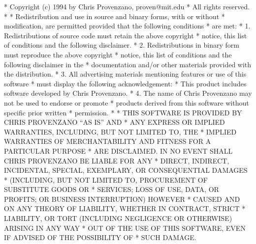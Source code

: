 \begin{copyrightEnv}
 * Copyright (c) 1994 by Chris Provenzano, proven@mit.edu
 * All rights reserved.
 *
 * Redistribution and use in source and binary forms, with or without
 * modification, are permitted provided that the following conditions
 * are met:
 * 1. Redistributions of source code must retain the above copyright
 *    notice, this list of conditions and the following disclaimer.
 * 2. Redistributions in binary form must reproduce the above copyright
 *    notice, this list of conditions and the following disclaimer in the
 *    documentation and/or other materials provided with the distribution.
 * 3. All advertising materials mentioning features or use of this software
 *    must display the following acknowledgement:
 *  This product includes software developed by Chris Provenzano.
 * 4. The name of Chris Provenzano may not be used to endorse or promote
 *        products derived from this software without specific prior written
 *        permission.
 *
 * THIS SOFTWARE IS PROVIDED BY CHRIS PROVENZANO ``AS IS'' AND
 * ANY EXPRESS OR IMPLIED WARRANTIES, INCLUDING, BUT NOT LIMITED TO, THE
 * IMPLIED WARRANTIES OF MERCHANTABILITY AND FITNESS FOR A PARTICULAR PURPOSE
 * ARE DISCLAIMED.  IN NO EVENT SHALL CHRIS PROVENZANO BE LIABLE FOR ANY
 * DIRECT, INDIRECT, INCIDENTAL, SPECIAL, EXEMPLARY, OR CONSEQUENTIAL DAMAGES
 * (INCLUDING, BUT NOT LIMITED TO, PROCUREMENT OF SUBSTITUTE GOODS OR
 * SERVICES; LOSS OF USE, DATA, OR PROFITS; OR BUSINESS INTERRUPTION) HOWEVER
 * CAUSED AND ON ANY THEORY OF LIABILITY, WHETHER IN CONTRACT, STRICT
 * LIABILITY, OR TORT (INCLUDING NEGLIGENCE OR OTHERWISE) ARISING IN ANY WAY
 * OUT OF THE USE OF THIS SOFTWARE, EVEN IF ADVISED OF THE POSSIBILITY OF
 * SUCH DAMAGE.
\end{copyrightEnv}

